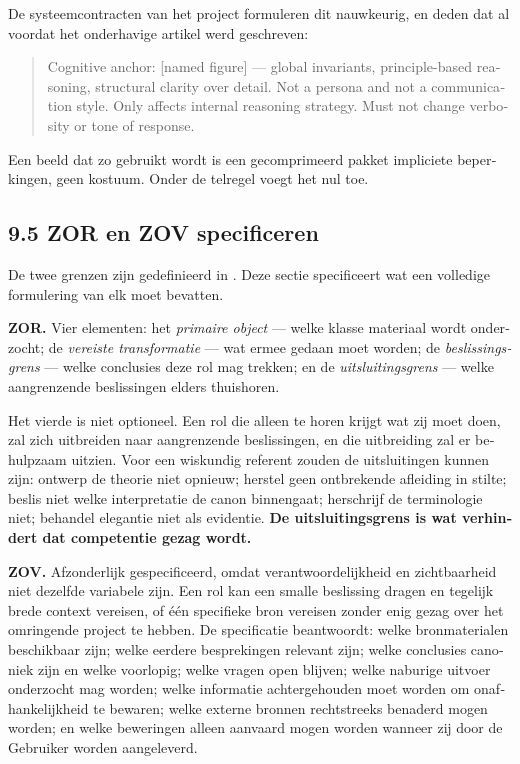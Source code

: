 \begin{dutch}
De systeemcontracten van het project formuleren dit nauwkeurig, en deden dat al voordat het onderhavige artikel werd geschreven:

\begin{quote}
Cognitive anchor: [named figure] — global invariants, principle-based reasoning, structural clarity over detail. Not a persona and not a communication style. Only affects internal reasoning strategy. Must not change verbosity or tone of response.
\end{quote}
Een beeld dat zo gebruikt wordt is een gecomprimeerd pakket impliciete beperkingen, geen kostuum. Onder de telregel voegt het nul toe.


\subsection*{9.5 ZOR en ZOV specificeren}
\label{sec:nl:9.5}

De twee grenzen zijn gedefinieerd in . Deze sectie specificeert wat een volledige formulering van elk moet bevatten.

\textbf{ZOR.} Vier elementen: het \emph{primaire object} — welke klasse materiaal wordt onderzocht; de \emph{vereiste transformatie} — wat ermee gedaan moet worden; de \emph{beslissingsgrens} — welke conclusies deze rol mag trekken; en de \emph{uitsluitingsgrens} — welke aangrenzende beslissingen elders thuishoren.

Het vierde is niet optioneel. Een rol die alleen te horen krijgt wat zij moet doen, zal zich uitbreiden naar aangrenzende beslissingen, en die uitbreiding zal er behulpzaam uitzien. Voor een wiskundig referent zouden de uitsluitingen kunnen zijn: ontwerp de theorie niet opnieuw; herstel geen ontbrekende afleiding in stilte; beslis niet welke interpretatie de canon binnengaat; herschrijf de terminologie niet; behandel elegantie niet als evidentie. \textbf{De uitsluitingsgrens is wat verhindert dat competentie gezag wordt.}

\textbf{ZOV.} Afzonderlijk gespecificeerd, omdat verantwoordelijkheid en zichtbaarheid niet dezelfde variabele zijn. Een rol kan een smalle beslissing dragen en tegelijk brede context vereisen, of één specifieke bron vereisen zonder enig gezag over het omringende project te hebben. De specificatie beantwoordt: welke bronmaterialen beschikbaar zijn; welke eerdere besprekingen relevant zijn; welke conclusies canoniek zijn en welke voorlopig; welke vragen open blijven; welke naburige uitvoer onderzocht mag worden; welke informatie achtergehouden moet worden om onafhankelijkheid te bewaren; welke externe bronnen rechtstreeks benaderd mogen worden; en welke beweringen alleen aanvaard mogen worden wanneer zij door de Gebruiker worden aangeleverd.


\end{dutch}
